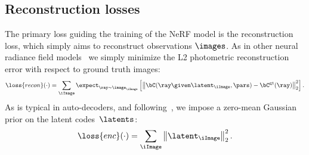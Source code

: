   \subsection{Reconstruction losses}
    \label{sec:conerf-autodecode}
    The primary loss guiding the training of the NeRF model is the
    reconstruction loss, which simply aims to reconstruct observations
    $\images$.
    As in other neural radiance field models~\cite{mildenhall2020nerf, martin2021nerfw, park2020deformable, park2021hypernerf} we simply minimize the L2 photometric reconstruction error with respect to ground truth images:
    \begin{equation}
      \loss{recon}(\cdot) = \sum_\iImage \expect_{\ray \sim \image_\iImage} \left[ \left\|\bC(\ray \given \latent_\iImage, \pars)-\bC^\text{gt}(\ray) \right\|_2^2 \right]
      .
      \label{eq:conerf-recon}
    \end{equation}
    As is typical in auto-decoders, and following~\cite{park2019deepsdf}, we impose a zero-mean Gaussian prior on the latent codes~$\latents$:
    \begin{equation}
      \loss{enc}(\cdot) = \sum_\iImage \left\| \latent_\iImage \right\|^2_2
      .
      \label{eq:conerf-latent_prior}
    \end{equation}

